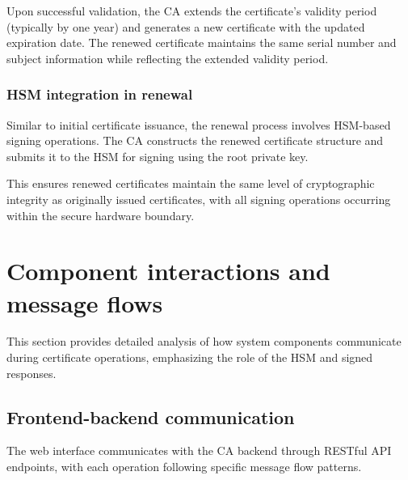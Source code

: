 Upon successful validation, the CA extends the certificate's validity period 
(typically by one year) and generates a new certificate with the updated expiration 
date. The renewed certificate maintains the same serial number and subject 
information while reflecting the extended validity period.

\subsubsection{HSM integration in renewal}

Similar to initial certificate issuance, the renewal process involves HSM-based 
signing operations. The CA constructs the renewed certificate structure and 
submits it to the HSM for signing using the root private key.

This ensures renewed certificates maintain the same level of cryptographic 
integrity as originally issued certificates, with all signing operations 
occurring within the secure hardware boundary.

\section{Component interactions and message flows}

This section provides detailed analysis of how system components communicate during 
certificate operations, emphasizing the role of the HSM and signed responses.

\subsection{Frontend-backend communication}

The web interface communicates with the CA backend through RESTful API endpoints, 
with each operation following specific message flow patterns.

